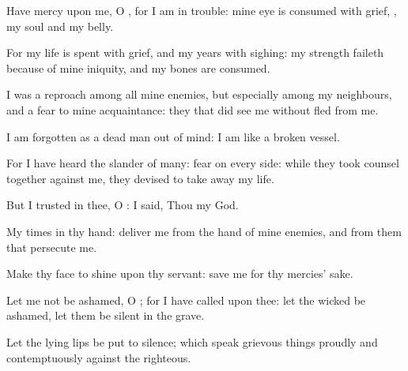 {\Q {}Have
mercy upon me, O
{}, for I am in
trouble: mine
eye is
consumed with
grief,
{}, my
soul and my
belly.


\par }{\Q {}For my
life is
spent with
grief, and my
years with
sighing: my
strength
faileth because of mine
iniquity, and my
bones are
consumed.


\par }{\Q {}I was a
reproach among all mine
enemies, but
especially among my
neighbours, and a
fear to mine
acquaintance: they that did
see me
without
fled from me.


\par }{\Q {}I am
forgotten as a dead
man out of
mind: I am like a
broken
vessel.


\par }{\Q {}For I have
heard the
slander of
many:
fear
{} on every
side: while they took
counsel
together against me, they
devised to take
away my
life.


\par }{\Q {}But I
trusted in thee, O
{}: I
said, Thou
{} my
God.


\par }{\Q {}My
times
{} in thy
hand:
deliver me from the
hand of mine
enemies, and from them that
persecute me.


\par }{\Q {}Make thy
face to
shine upon thy
servant:
save me for thy
mercies’ sake.


\par }{\Q {}Let me not be
ashamed, O
{}; for I have
called upon thee: let the
wicked be
ashamed,
{} let them be
silent in the
grave.


\par }{\Q {}Let the
lying
lips be put to
silence; which
speak
grievous things
proudly and
contemptuously against the
righteous.


\par }{\BB \par }
